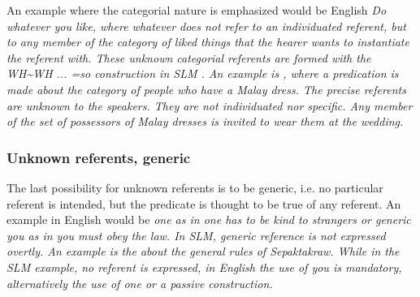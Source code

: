 An example where the categorial nature is emphasized would be  English   \em Do whatever you like\em, where \em whatever \em does not refer to an individuated referent, but to any member of the category of liked things that the hearer wants to instantiate the referent with. These unknown categorial referents are formed with the WH\~{}WH ... \em=so \em  construction in SLM . An example is
, where a predication is made about the category of people who have a Malay dress. The precise referents are unknown to the speakers. They are not individuated nor specific. Any member of the set of possessors of Malay dresses is invited to wear them at the wedding.



\subsubsection{Unknown referents, generic}\label{sec:func:Unknownreferents,generic}
The last possibility for unknown referents is to be generic, i.e. no particular referent is intended, but the predicate is thought to be true of any referent. An example in English would be \em one \em as in \em one has to be kind to strangers \em or generic \em you \em as in \em you must obey the law\em. In SLM, generic reference is not expressed overtly. An example is the  about the general rules of Sepaktakraw. While in the SLM example, no referent is expressed, in English the use of \em you \em is mandatory, alternatively the use of \em one \em or a passive construction.



